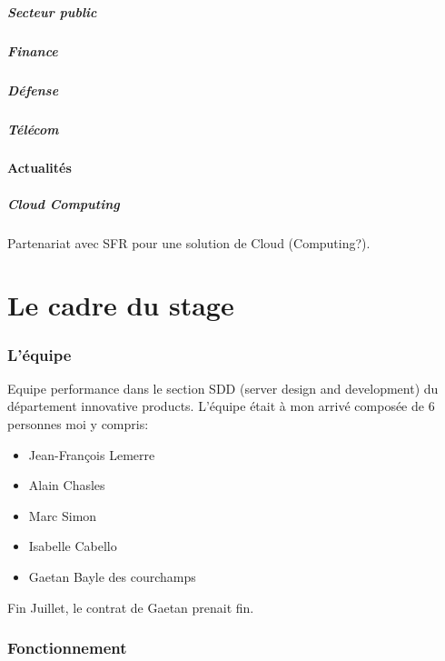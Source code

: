 \documentclass[11pt]{article}
\begin{document}
			\subsubsection{Secteur public}
			\subsubsection{Finance}
			\subsubsection{Défense}
			\subsubsection{Télécom}
		\subsection{Actualités}
			\subsubsection{Cloud Computing}
			Partenariat avec SFR pour une solution de Cloud (Computing?).

\newpage
{}
\part{Le cadre du stage}
	\section{L'équipe}
	Equipe performance dans le section SDD (server design and development) du département innovative products. L'équipe était 
	à mon arrivé composée de 6 personnes moi y compris:
	\begin{itemize}
	\item Jean-François Lemerre
	\item Alain Chasles
	\item Marc Simon
	\item Isabelle Cabello
	\item Gaetan Bayle des courchamps
	\end{itemize}
	Fin Juillet, le contrat de Gaetan prenait fin.
	\section{Fonctionnement}

\newpage
{}
\end{document}
